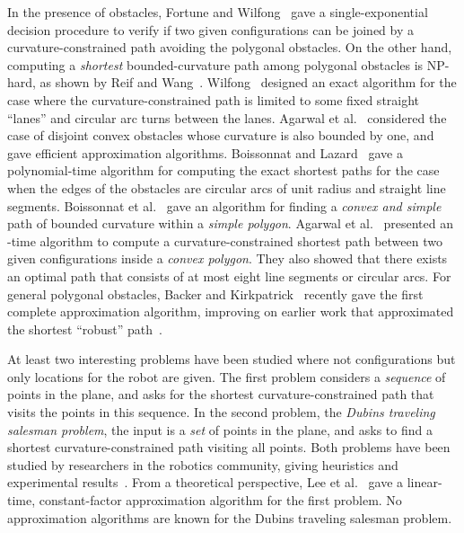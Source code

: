 \documentclass[a4paper]{article}
\begin{document}
In the presence of obstacles, Fortune and Wilfong~\cite{fw-pcm-91}
gave a single-exponential decision procedure to verify if two given
configurations can be joined by a curvature-constrained path avoiding
the polygonal obstacles.  On the other hand, computing a
\emph{shortest} bounded-curvature path among polygonal obstacles is
NP-hard, as shown by Reif and Wang~\cite{rw-ctdcc-98}.
Wilfong~\cite{w-mpav-88} designed an exact algorithm for the case
where the curvature-constrained path is limited to some fixed straight
``lanes'' and circular arc turns between the lanes.  Agarwal et
al.~\cite{art-mpscr-95} considered the case of disjoint convex
obstacles whose curvature is also bounded by one, and gave efficient
approximation algorithms. Boissonnat and Lazard~\cite{bl-ptacs-03}
gave a polynomial-time algorithm for computing the exact shortest
paths for the case when the edges of the obstacles are circular arcs
of unit radius and straight line segments. Boissonnat et
al.~\cite{bgkl-accsp-02} gave an  algorithm for finding a
\emph{convex and simple} path of bounded curvature within a
\emph{simple polygon}.  Agarwal et al.~\cite{ablrsw-ccspc-02}
presented an -time algorithm to compute a
curvature-constrained shortest path between two given configurations
inside a \emph{convex polygon}.  They also showed that there exists an
optimal path that consists of at most eight line segments or circular
arcs.  For general polygonal obstacles, Backer and
Kirkpatrick~\cite{bk-caasb-08} recently gave the first complete
approximation algorithm, improving on earlier work that approximated
the shortest ``robust'' path~\cite{jc-pspmr-92,aw-aaccs-01}.

At least two interesting problems have been studied where not
configurations but only locations for the robot are given.  The first
problem considers a \emph{sequence} of points in the plane, and asks
for the shortest curvature-constrained path that visits the points in
this sequence.  In the second problem, the \emph{Dubins traveling
  salesman problem}, the input is a \emph{set} of points in the plane,
and asks to find a shortest curvature-constrained path visiting all
points.  Both problems have been studied by researchers in the
robotics community, giving heuristics and experimental
results~\cite{sfb-opptspdv-05,mc-rhpdtsp-06,leny_07}. From a
theoretical perspective, Lee et al.~\cite{lcksc-accsp-00} gave a
linear-time, constant-factor approximation algorithm for the first
problem.  No approximation algorithms are known for the Dubins
traveling salesman problem.
\end{document}
